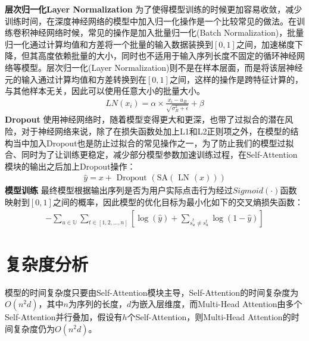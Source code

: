 \textbf{层次归一化Layer Normalization}
为了使得模型训练的时候更加容易收敛，减少训练时间，在深度神经网络的模型中加入归一化操作是一个比较常见的做法。在训练卷积神经网络时候，常见的操作是加入批量归一化(Batch Normalization)，批量归一化通过计算均值和方差将一个批量的输入数据装换到$[0,1]$之间，加速梯度下降，但其高度依赖批量的大小，同时也不适用于输入序列长度不固定的循环神经网络等模型。层次归一化(Layer Normalization)则不是在样本层面，而是将该层神经元的输入通过计算均值和方差转换到在$[0,1]$之间，这样的操作是跨特征计算的，与其他样本无关，因此可以使用任意大小的批量大小。
\begin{align}
	LN(x_i)=\alpha\times\frac{x_i-u_B}{\sqrt{\sigma_B^2+\epsilon}}+\beta
\end{align}
\textbf{Dropout}
使用神经网络时，随着模型变得更大和更深，也带了过拟合的潜在风险，对于神经网络来说，除了在损失函数处加上L1和L2正则项之外，在模型的结构当中加入Dropout也是防止过拟合的常见操作之一，为了防止我们的模型过拟合、同时为了让训练更稳定，减少部分模型参数加速训练过程，在Self-Attention模块的输出之后加上Dropout操作：
\begin{align}
	\hat{y}=x+\text { Dropout }(\text {SA}(\text { LN }(x)))
\end{align}
\textbf{模型训练}
最终模型根据输出序列是否为用户实际点击行为经过$Sigmoid(\cdot )$函数映射到$[0,1]$之间的概率，因此模型的优化目标为最小化如下的交叉熵损失函数：
\begin{align}
-\sum_{{u} \in \mathbb{U}} \sum_{t \in[1,2, \ldots, n]}\left[\log (\hat{y})+\sum_{\hat{s}_{u}^{t}\neq s_{u}^{t}} \log (1-\hat{y})\right]
\end{align}
\section{复杂度分析}
模型的时间复杂度只要由Self-Attention模块主导，Self-Attention的时间复杂度为$O(n^{2} d)$，其中$n$为序列的长度，$d$为嵌入层维度，而Multi-Head Attention由多个Self-Attention并行叠加，假设有$h$个Self-Attention，则Multi-Head Attention的时间复杂度仍为$O(n^{2} d)$。
